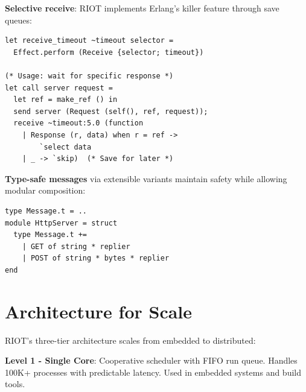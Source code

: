 \documentclass[sigplan,10pt]{acmart}
\begin{document}
\textbf{Selective receive}: RIOT implements Erlang's killer feature through save queues:
\begin{lstlisting}
let receive_timeout ~timeout selector =
  Effect.perform (Receive {selector; timeout})

(* Usage: wait for specific response *)
let call server request =
  let ref = make_ref () in
  send server (Request (self(), ref, request));
  receive ~timeout:5.0 (function
    | Response (r, data) when r = ref -> 
        `select data
    | _ -> `skip)  (* Save for later *)
\end{lstlisting}

\textbf{Type-safe messages} via extensible variants maintain safety while allowing modular composition:
\begin{lstlisting}
type Message.t = ..
module HttpServer = struct
  type Message.t += 
    | GET of string * replier
    | POST of string * bytes * replier
end
\end{lstlisting}

\vspace{-0.2cm}
\section{Architecture for Scale}

RIOT's three-tier architecture scales from embedded to distributed:

\begin{center}
\end{center}

\textbf{Level 1 - Single Core}: Cooperative scheduler with FIFO run queue. Handles 100K+ processes with predictable latency. Used in embedded systems and build tools.
\end{document}
